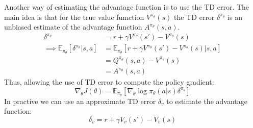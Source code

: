 Another way of estimating the advantage function is to use the TD error. The 
main idea is that for the true value fumction \(V^{\pi_\theta}(s)\) the TD error \(\delta ^{\pi_\theta}\)
is an unbiased estimate of the advantage function \(A^{\pi_\theta}(s,a)\).
\[
    \begin{aligned}
        \delta ^{\pi_\theta} &= r + \gamma V^{\pi_\theta}(s') - V^{\pi_\theta}(s) \\
        \implies \mathbb{E}_{\pi_\theta} \left[ 
            \delta ^{\pi_\theta} | s,a
        \right] &= \mathbb{E}_{\pi_\theta} \left[ 
            r + \gamma V^{\pi_\theta}(s') - V^{\pi_\theta}(s) | s,a
        \right] \\
        &= Q^{\pi_\theta}(s,a) - V^{\pi_\theta}(s) \\
        &= A^{\pi_\theta}(s,a)
    \end{aligned}
\]
Thus, allowing the use of TD error to compute the policy gradient:
\[
    \nabla_\theta J(\theta) = \mathbb{E}_{\pi_\theta} \left[ 
        \nabla_\theta \log \pi_\theta(a|s) \delta ^{\pi_\theta}
    \right]
\]
In practive we can use an approximate TD error \(\delta _v\) to estimate the advantage function:
\[
    \delta _v = r + \gamma V_v(s') - V_v(s)
\]
